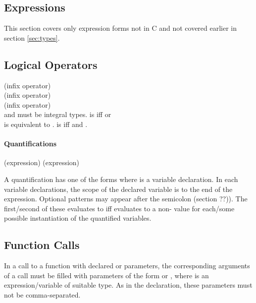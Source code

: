 \documentclass[preprint,nocopyrightspace]{sigplanconf}
\newcommand{\subsubsubsection}[1]{\paragraph{#1}}
\begin{document}
{{{\begin{VCC}
\section{Expressions}
This section covers only expression forms not in C and not covered
earlier in section \ref{sec:types}.

\subsection{Logical Operators}

 (infix operator) \\
 (infix operator)\\
 (infix operator)\\
 and  must be integral types. 
 is \vcc{\true} iff  or \\
 is equivalent to .
 is \vcc{\true} iff  and .

\subsubsubsection{Quantifications}

 (expression)
 (expression)

A quantification has one of the forms
where  is a variable declaration. In each variable
declarations, the scope of the declared variable is to the end of the
expression. Optional patterns may appear after the semicolon
(section ??)). 
The first/second of these evaluates to 
\vcc{\true} iff  evaluates to a non-\vcc{\false} value for
each/some possible instantiation of the quantified variables.

\subsection{Function Calls}
In a call to a function with declared  or 
parameters, the corresponding arguments of a call must be filled with
parameters of the form  or ,
where  is an expression/variable of suitable type. As in the
declaration, these parameters must not be comma-separated.




\end{VCC}}}}
\end{document}
